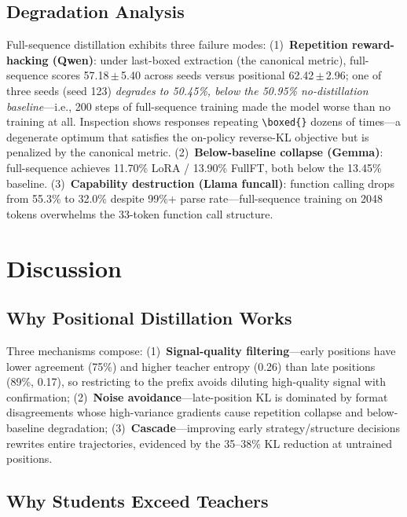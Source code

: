 \documentclass[10pt]{article}
\begin{document}
\subsection{Degradation Analysis}
\label{sec:degradation}

Full-sequence distillation exhibits three failure modes:
(1)~\textbf{Repetition reward-hacking (Qwen)}: under last-boxed extraction (the canonical metric), full-sequence scores 57.18\,$\pm$\,5.40 across seeds versus positional 62.42\,$\pm$\,2.96; one of three seeds (seed 123) \emph{degrades to 50.45\%, below the 50.95\% no-distillation baseline}---i.e., 200 steps of full-sequence training made the model worse than no training at all. Inspection shows responses repeating \texttt{\textbackslash boxed\{\}} dozens of times---a degenerate optimum that satisfies the on-policy reverse-KL objective but is penalized by the canonical metric.
(2)~\textbf{Below-baseline collapse (Gemma)}: full-sequence achieves 11.70\% LoRA / 13.90\% FullFT, both below the 13.45\% baseline.
(3)~\textbf{Capability destruction (Llama funcall)}: function calling drops from 55.3\% to 32.0\% despite 99\%+ parse rate---full-sequence training on 2048 tokens overwhelms the 33-token function call structure.


\section{Discussion}
\label{sec:discussion}

\subsection{Why Positional Distillation Works}

Three mechanisms compose: (1)~\textbf{Signal-quality filtering}---early positions have lower agreement (75\%) and higher teacher entropy (0.26) than late positions (89\%, 0.17), so restricting to the prefix avoids diluting high-quality signal with confirmation; (2)~\textbf{Noise avoidance}---late-position KL is dominated by format disagreements whose high-variance gradients cause repetition collapse and below-baseline degradation; (3)~\textbf{Cascade}---improving early strategy/structure decisions rewrites entire trajectories, evidenced by the 35--38\% KL reduction at untrained positions.

\subsection{Why Students Exceed Teachers}
\end{document}

